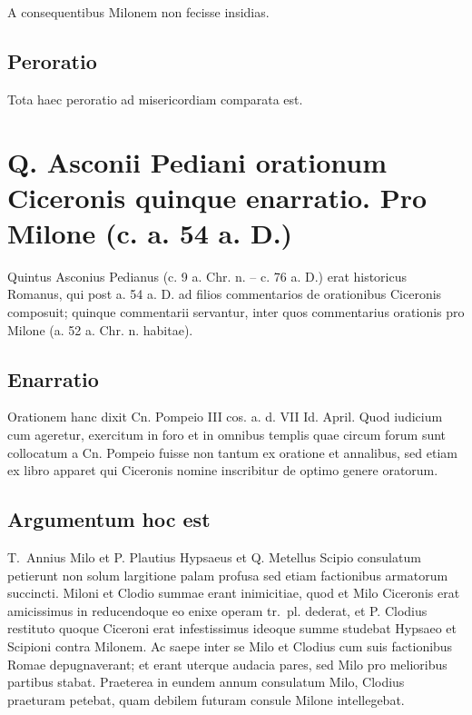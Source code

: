 A consequentibus Milonem non fecisse insidias.

\subsection*{Peroratio}

Tota haec peroratio ad misericordiam comparata est.


\section*{Q. Asconii Pediani orationum Ciceronis quinque enarratio. Pro Milone (c. a. 54 a. D.)}

Quintus Asconius Pedianus (c. 9 a. Chr. n. – c. 76 a. D.) erat historicus Romanus, qui post a. 54 a. D. ad filios commentarios de orationibus Ciceronis composuit; quinque commentarii servantur, inter quos commentarius orationis pro Milone (a. 52 a. Chr. n. habitae).

\subsection*{Enarratio}


Orationem hanc dixit Cn. Pompeio III cos. a. d. VII Id. April. Quod iudicium cum ageretur, exercitum in foro et in omnibus templis quae circum forum sunt collocatum a Cn. Pompeio fuisse non tantum ex oratione et annalibus, sed etiam ex libro apparet qui Ciceronis nomine inscribitur de optimo genere oratorum.

\subsection*{Argumentum hoc est}

T.~Annius Milo et P. Plautius Hypsaeus et Q. Metellus Scipio consulatum petierunt non solum largitione palam profusa sed etiam factionibus armatorum succincti. Miloni et Clodio summae erant inimicitiae, quod et Milo Ciceronis erat amicissimus in reducendoque eo enixe operam tr.~pl. dederat, et P. Clodius restituto quoque Ciceroni erat infestissimus ideoque summe studebat Hypsaeo et Scipioni contra Milonem. Ac saepe inter se Milo et Clodius cum suis factionibus Romae depugnaverant; et erant uterque audacia pares, sed Milo pro melioribus partibus stabat. Praeterea in eundem annum consulatum Milo, Clodius praeturam petebat, quam debilem futuram consule Milone intellegebat. 

